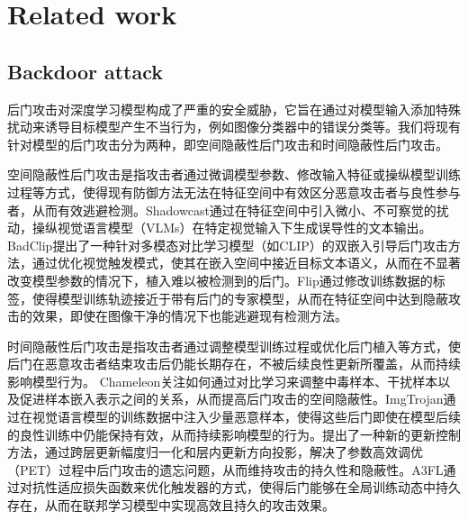 \documentclass[lettersize,journal]{IEEEtran}
\begin{document}
\section{Related work}


\subsection{Backdoor attack}
后门攻击对深度学习模型构成了严重的安全威胁，它旨在通过对模型输入添加特殊扰动来诱导目标模型产生不当行为，例如图像分类器中的错误分类等。我们将现有针对模型的后门攻击分为两种，即空间隐蔽性后门攻击和时间隐蔽性后门攻击。

空间隐蔽性后门攻击是指攻击者通过微调模型参数、修改输入特征或操纵模型训练过程等方式，使得现有防御方法无法在特征空间中有效区分恶意攻击者与良性参与者，从而有效逃避检测。Shadowcast\cite{xu2024shadowcast}通过在特征空间中引入微小、不可察觉的扰动，操纵视觉语言模型（VLMs）在特定视觉输入下生成误导性的文本输出。BadClip\cite{liang2024badclip}提出了一种针对多模态对比学习模型（如CLIP）的双嵌入引导后门攻击方法，通过优化视觉触发模式，使其在嵌入空间中接近目标文本语义，从而在不显著改变模型参数的情况下，植入难以被检测到的后门。Flip\cite{jha2023label}通过修改训练数据的标签，使得模型训练轨迹接近于带有后门的专家模型，从而在特征空间中达到隐蔽攻击的效果，即使在图像干净的情况下也能逃避现有检测方法。

时间隐蔽性后门攻击是指攻击者通过调整模型训练过程或优化后门植入等方式，使后门在恶意攻击者结束攻击后仍能长期存在，不被后续良性更新所覆盖，从而持续影响模型行为。 Chameleon\cite{dai2023chameleon}关注如何通过对比学习来调整中毒样本、干扰样本以及促进样本嵌入表示之间的关系，从而提高后门攻击的空间隐蔽性。ImgTrojan\cite{tao2024imgtrojan}通过在视觉语言模型的训练数据中注入少量恶意样本，使得这些后门即使在模型后续的良性训练中仍能保持有效，从而持续影响模型的行为。\cite{gu2023gradient}提出了一种新的更新控制方法，通过跨层更新幅度归一化和层内更新方向投影，解决了参数高效调优（PET）过程中后门攻击的遗忘问题，从而维持攻击的持久性和隐蔽性。A3FL\cite{zhang2024a3fl}通过对抗性适应损失函数来优化触发器的方式，使得后门能够在全局训练动态中持久存在，从而在联邦学习模型中实现高效且持久的攻击效果。
\end{document}
